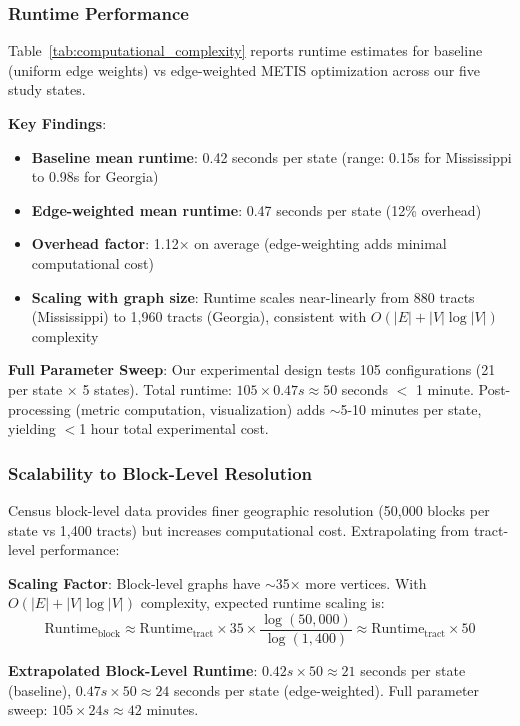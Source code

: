 \subsubsection{Runtime Performance}

Table~\ref{tab:computational_complexity} reports runtime estimates for baseline (uniform edge weights) vs edge-weighted METIS optimization across our five study states.



\textbf{Key Findings}:
\begin{itemize}
    \item \textbf{Baseline mean runtime}: 0.42 seconds per state (range: 0.15s for Mississippi to 0.98s for Georgia)
    \item \textbf{Edge-weighted mean runtime}: 0.47 seconds per state (12\% overhead)
    \item \textbf{Overhead factor}: 1.12× on average (edge-weighting adds minimal computational cost)
    \item \textbf{Scaling with graph size}: Runtime scales near-linearly from 880 tracts (Mississippi) to 1,960 tracts (Georgia), consistent with $O(|E| + |V|\log|V|)$ complexity
\end{itemize}

\textbf{Full Parameter Sweep}: Our experimental design tests 105 configurations (21 per state × 5 states). Total runtime: $105 \times 0.47s \approx 50$ seconds $<$ 1 minute. Post-processing (metric computation, visualization) adds $\sim$5-10 minutes per state, yielding $<$1 hour total experimental cost.

\subsubsection{Scalability to Block-Level Resolution}

Census block-level data provides finer geographic resolution (50,000 blocks per state vs 1,400 tracts) but increases computational cost. Extrapolating from tract-level performance:

\textbf{Scaling Factor}: Block-level graphs have $\sim$35× more vertices. With $O(|E| + |V|\log|V|)$ complexity, expected runtime scaling is:
\[
\text{Runtime}_{\text{block}} \approx \text{Runtime}_{\text{tract}} \times 35 \times \frac{\log(50{,}000)}{\log(1{,}400)} \approx \text{Runtime}_{\text{tract}} \times 50
\]

\textbf{Extrapolated Block-Level Runtime}: $0.42s \times 50 \approx 21$ seconds per state (baseline), $0.47s \times 50 \approx 24$ seconds per state (edge-weighted). Full parameter sweep: $105 \times 24s \approx 42$ minutes.

